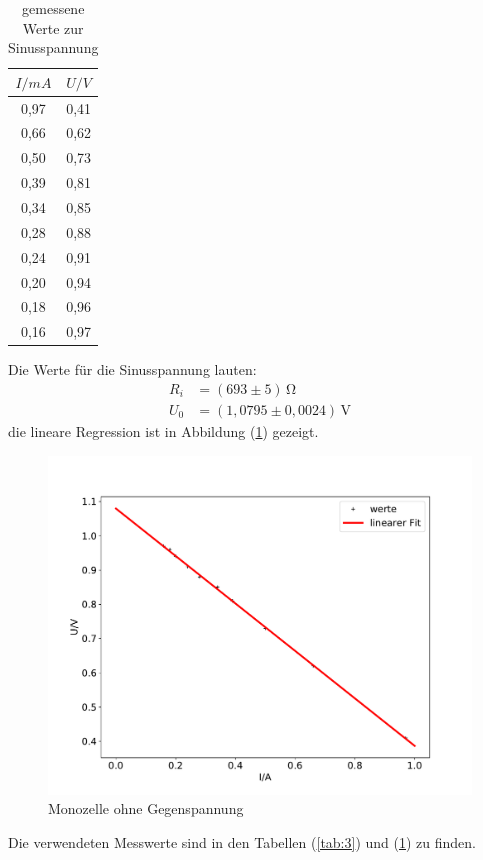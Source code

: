 \begin{table}
  \centering
  \caption{gemessene Werte zur Sinusspannung}
  \label{tab:4}
  \begin{tabular}{c c}
    \toprule $I/mA$ & $U/V$  \\
    \midrule
    0,97 & 0,41\\
    0,66 & 0,62\\
    0,50 & 0,73\\
    0,39 & 0,81\\
    0,34 & 0,85\\
    0,28 & 0,88\\
    0,24 & 0,91\\
    0,20 & 0,94\\
    0,18 & 0,96\\
    0,16 & 0,97\\
    \bottomrule
  \end{tabular}
\end{table}
Die Werte für die Sinusspannung lauten:
\begin{align*}
  R_i &= (693 \pm 5)\, \mathrm{\Omega}\\
  U_0 &= (1,0795 \pm 0,0024)\, \mathrm{V}
\end{align*}
die lineare Regression ist in Abbildung (\ref{fig:d}) gezeigt.
  \begin{figure}[H]
    \centering
    \includegraphics[width=\textwidth]{plotsin.pdf}
    \caption{Monozelle ohne Gegenspannung}
    \label{fig:d}
  \end{figure}
Die verwendeten Messwerte sind in den Tabellen (\ref{tab:3}) und (\ref{tab:4}) zu finden.


